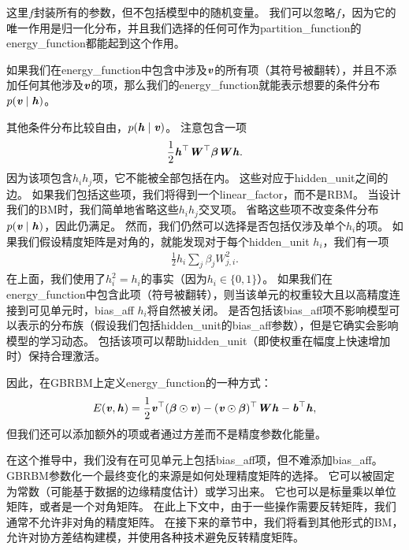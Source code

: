
这里$f$封装所有的参数，但不包括模型中的随机变量。
我们可以忽略$f$，因为它的唯一作用是归一化分布，并且我们选择的任何可作为\gls{partition_function}的\gls{energy_function}都能起到这个作用。

如果我们在\gls{energy_function}中包含中涉及$\boldsymbol{\mathit{v}}$的所有项（其符号被翻转），并且不添加任何其他涉及$\boldsymbol{\mathit{v}}$的项，那么我们的\gls{energy_function}就能表示想要的条件分布$p(\boldsymbol{\mathit{v}}  \mid  \boldsymbol{\mathit{h}})$。

其他条件分布比较自由，$p(\boldsymbol{\mathit{h}}  \mid  \boldsymbol{\mathit{v}})$。
注意包含一项
\begin{align}
 \frac{1}{2}\boldsymbol{\mathit{h}}^\top\boldsymbol{\mathit{W}}^\top \boldsymbol{\beta} \boldsymbol{\mathit{W}} \boldsymbol{\mathit{h}} .
\end{align}
因为该项包含$h_i h_j$项，它不能被全部包括在内。
这些对应于\gls{hidden_unit}之间的边。
如果我们包括这些项，我们将得到一个\gls{linear_factor}，而不是\gls{RBM}。
当设计我们的\gls{BM}时，我们简单地省略这些$h_i h_j$交叉项。
省略这些项不改变条件分布$p(\boldsymbol{\mathit{v}}  \mid  \boldsymbol{\mathit{h}})$，因此仍满足。
然而，我们仍然可以选择是否包括仅涉及单个$h_i$的项。
如果我们假设精度矩阵是对角的，就能发现对于每个\gls{hidden_unit} $h_i$，我们有一项
\begin{align}
 \frac{1}{2} h_i \sum_j \beta_j W_{j,i}^2.
\end{align}
在上面，我们使用了$h_i^2 = h_i$的事实（因为$h_i \in \{ 0, 1\}$）。
如果我们在\gls{energy_function}中包含此项（符号被翻转），则当该单元的权重较大且以高精度连接到可见单元时，\gls{bias_aff} $h_i$将自然被关闭。
是否包括该\gls{bias_aff}项不影响模型可以表示的分布族（假设我们包括\gls{hidden_unit}的\gls{bias_aff}参数），但是它确实会影响模型的学习动态。
包括该项可以帮助\gls{hidden_unit}（即使权重在幅度上快速增加时）保持合理激活。

因此，在\gls{GBRBM}上定义\gls{energy_function}的一种方式：
\begin{align}
 E(\boldsymbol{\mathit{v}}, \boldsymbol{\mathit{h}}) = \frac{1}{2} \boldsymbol{\mathit{v}}^\top (\boldsymbol{\beta} \odot \boldsymbol{\mathit{v}}) -  (\boldsymbol{\mathit{v}} \odot \boldsymbol{\beta})^\top\boldsymbol{\mathit{W}} \boldsymbol{\mathit{h}} - \boldsymbol{\mathit{b}}^\top \boldsymbol{\mathit{h}},
\end{align}
但我们还可以添加额外的项或者通过方差而不是精度参数化能量。


在这个推导中，我们没有在可见单元上包括\gls{bias_aff}项，但不难添加\gls{bias_aff}。
\gls{GBRBM}参数化一个最终变化的来源是如何处理精度矩阵的选择。
它可以被固定为常数（可能基于数据的边缘精度估计）或学习出来。
它也可以是标量乘以单位矩阵，或者是一个对角矩阵。
在此上下文中，由于一些操作需要反转矩阵，我们通常不允许非对角的精度矩阵。
在接下来的章节中，我们将看到其他形式的\gls{BM}，允许对协方差结构建模，并使用各种技术避免反转精度矩阵。


